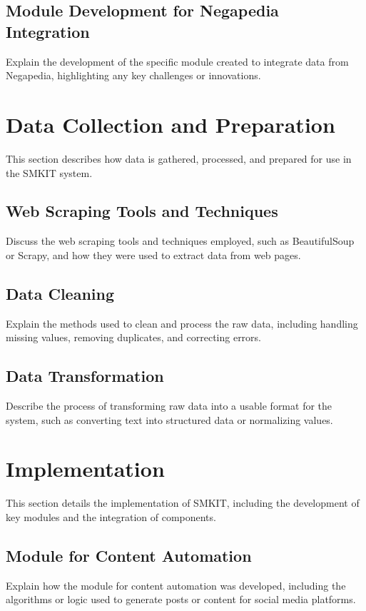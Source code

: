 \subsection{Module Development for Negapedia Integration}
\label{subsec:module_development_negapedia}
Explain the development of the specific module created to integrate data from Negapedia, highlighting any key challenges or innovations.

\section{Data Collection and Preparation}
\label{sec:data_collection_preparation}
This section describes how data is gathered, processed, and prepared for use in the SMKIT system.

\subsection{Web Scraping Tools and Techniques}
\label{subsec:web_scraping_tools_techniques}
Discuss the web scraping tools and techniques employed, such as BeautifulSoup or Scrapy, and how they were used to extract data from web pages.

\subsection{Data Cleaning}
\label{subsec:data_cleaning}
Explain the methods used to clean and process the raw data, including handling missing values, removing duplicates, and correcting errors.

\subsection{Data Transformation}
\label{subsec:data_transformation}
Describe the process of transforming raw data into a usable format for the system, such as converting text into structured data or normalizing values.

\section{Implementation}
\label{sec:implementation}
This section details the implementation of SMKIT, including the development of key modules and the integration of components.

\subsection{Module for Content Automation}
\label{subsec:module_for_content_automation}
Explain how the module for content automation was developed, including the algorithms or logic used to generate posts or content for social media platforms.

